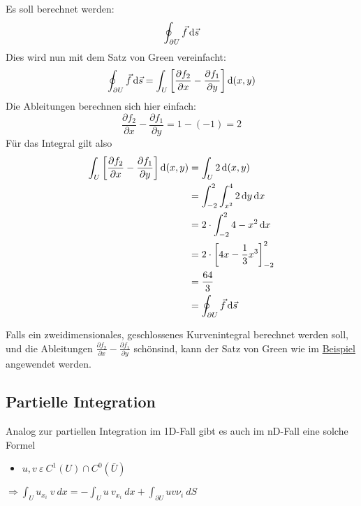 \noindent
Es soll berechnet werden:
\begin{equation*}
    \oint_{\partial U} \vec{f}\mathop{}\!\mathrm{d} \vec{s}
\end{equation*}
Dies wird nun mit dem Satz von Green vereinfacht:
\begin{equation*}
    \oint_{\partial U} \vec{f}\mathop{}\!\mathrm{d} \vec{s} = \int_U \left[ \frac{\partial f_2}{\partial x} - \frac{\partial f_1}{\partial y} \right] \mathop{}\!\mathrm{d} (x,y)
\end{equation*}
Die Ableitungen berechnen sich hier einfach:
\begin{equation*}
    \frac{\partial f_2}{\partial x} - \frac{\partial f_1}{\partial y} = 1 - (-1) = 2
\end{equation*}
Für das Integral gilt also
\begin{equation*}
\begin{split}
    \int_U \left[ \frac{\partial f_2}{\partial x} - \frac{\partial f_1}{\partial y} \right] \mathop{}\!\mathrm{d} (x,y) & = \int_U 2 \mathop{}\!\mathrm{d} (x,y)\\
    & = \int_{-2}^2 \int_{x^2}^4 2 \mathop{}\!\mathrm{d} y \mathop{}\!\mathrm{d} x \\
    & = 2 \cdot \int_{-2}^24-x^2 \mathop{}\!\mathrm{d} x \\
    & = 2 \cdot \left[ 4x-\frac{1}{3}x^3\right]_{-2}^2  \\
    & = \frac{64}{3} \\
    & = \oint_{\partial U} \vec{f}\mathop{}\!\mathrm{d} \vec{s}
\end{split}
\end{equation*}

Falls ein zweidimensionales, geschlossenes Kurvenintegral berechnet werden soll, und die Ableitungen $\frac{\partial f_2}{\partial x} - \frac{\partial f_1}{\partial y}$ \glqq schön\grqq sind, kann der Satz von Green wie im \hyperref[par:green-bsp]{Beispiel} angewendet werden.

\subsection{Partielle Integration}
Analog zur partiellen Integration im 1D-Fall gibt es auch im nD-Fall eine solche Formel\\
\begin{itemize}
    \item $u,v \ \varepsilon \ C^1(U)\cap C^0(\bar{U})$
\end{itemize}

\begin{centering}
    $\Rightarrow \int_U u_{x_i} \ v \ dx = -\int_U u \ v_{x_i} \ dx + \int_{\partial U} uv\nu_i \ dS$\\
\end{centering}

